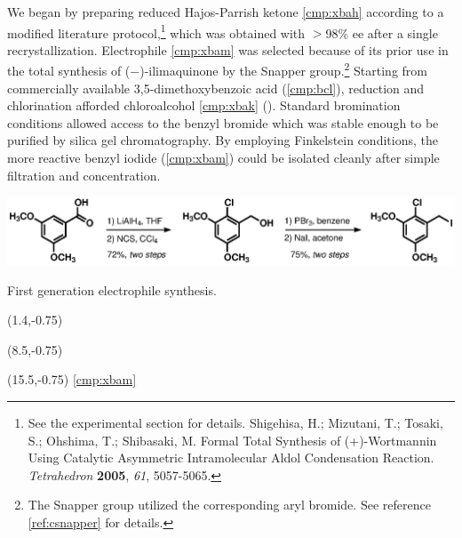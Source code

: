 We began by preparing reduced Hajos-Parrish ketone \ref{cmp:xbah} according to a modified literature
protocol,\footnote{See the experimental section for details. {\frenchspacing Shigehisa, H.;
Mizutani, T.; Tosaki, S.; Ohshima, T.; Shibasaki, M. Formal Total Synthesis of (+)-Wortmannin Using
Catalytic Asymmetric Intramolecular Aldol Condensation Reaction. \textit{Tetrahedron} \textbf{2005},
\textit{61}, 5057-5065.}} which was obtained with $>$98\% ee after a single recrystallization.
Electrophile \ref{cmp:xbam} was selected because of its prior
use in the total synthesis of ($-$)-ilimaquinone by the Snapper
group.\footnote{The Snapper group utilized the corresponding aryl bromide. See reference
\ref{ref:csnapper} for details.} Starting from commercially available
3,5-dimethoxybenzoic acid (\ref{cmp:bcl}), reduction and chlorination afforded chloroalcohol \ref{cmp:xbak} (). Standard bromination conditions allowed access to the benzyl bromide which was stable enough to be purified by silica gel chromatography. By employing
Finkelstein conditions, the more reactive benzyl iodide (\ref{cmp:xbam}) could be isolated cleanly
after simple filtration and concentration.

\begin{Scheme}[h]
  \centering
  \includegraphics[scale=0.8]{chp_singlecarbon/images/genoneelectrophile}
  \caption{First generation electrophile synthesis.}
  \begin{textblock}{1}(1.4,-0.75)  \end{textblock}
  \begin{textblock}{1}(8.5,-0.75) \end{textblock}
  \begin{textblock}{1}(15.5,-0.75) \textsf{\scriptsize{\ref{cmp:xbam}}}
\end{textblock}
  \label{sch:ephileone}
\end{Scheme}



